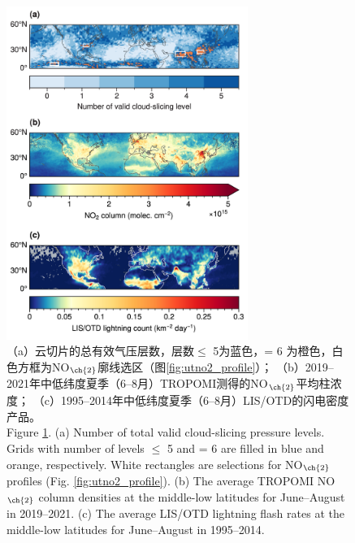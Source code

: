 \clearpage\vspace*{\fill}
\begin{figure}[H]
    \centering
    \includegraphics[width=0.7\textwidth]{./figures/no2_ltngcount.png}
    \caption{
    （a）云切片的总有效气压层数，层数$\leq$ 5为蓝色，= 6 为橙色，白色方框为NO$_{\ch{2}}$廓线选区（图\ref{fig:utno2_profile}）；
    （b）2019--2021年中低纬度夏季（6--8月）TROPOMI测得的NO$_{\ch{2}}$平均柱浓度；
    （c）1995--2014年中低纬度夏季（6--8月）LIS/OTD的闪电密度产品。 \\
    Figure \ref{fig:no2_ltngcount}. (a) Number of total valid cloud-slicing pressure levels.
    Grids with number of levels $\leq$ 5 and = 6 are filled in blue and orange, respectively.
    White rectangles are selections for NO$_{\ch{2}}$ profiles (Fig. \ref{fig:utno2_profile}).
    (b) The average TROPOMI NO$_{\ch{2}}$ column densities at the middle-low latitudes for June--August in 2019--2021.
    (c) The average LIS/OTD lightning flash rates at the middle-low latitudes for June--August in 1995--2014.
    }
    \label{fig:no2_ltngcount}
\end{figure}
\vspace*{\fill}\clearpage


